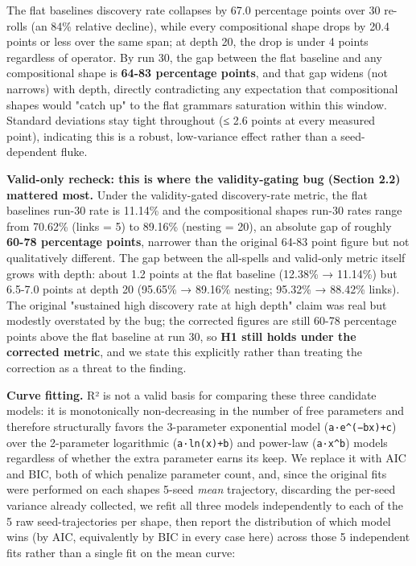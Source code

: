 \documentclass[
  10pt,
  twocolumn]{article}
\begin{document}
The flat baseline\textquotesingle s discovery rate collapses by 67.0
percentage points over 30 re-rolls (an 84\% relative decline), while
every compositional shape drops by 20.4 points or less over the same
span; at depth 20, the drop is under 4 points regardless of operator. By
run 30, the gap between the flat baseline and any compositional shape is
\textbf{64-83 percentage points}, and that gap widens (not narrows) with
depth, directly contradicting any expectation that compositional shapes
would "catch up" to the flat grammar\textquotesingle s saturation within
this window. Standard deviations stay tight throughout (≤ 2.6 points at
every measured point), indicating this is a robust, low-variance effect
rather than a seed-dependent fluke.

\textbf{Valid-only recheck: this is where the validity-gating bug
(Section 2.2) mattered most.} Under the validity-gated discovery-rate
metric, the flat baseline\textquotesingle s run-30 rate is 11.14\% and
the compositional shapes\textquotesingle{} run-30 rates range from
70.62\% (links = 5) to 89.16\% (nesting = 20), an absolute gap of
roughly \textbf{60-78 percentage points}, narrower than the original
64-83 point figure but not qualitatively different. The gap between the
all-spells and valid-only metric itself grows with depth: about 1.2
points at the flat baseline (12.38\% → 11.14\%) but 6.5-7.0 points at
depth 20 (95.65\% → 89.16\% nesting; 95.32\% → 88.42\% links). The
original "sustained high discovery rate at high depth" claim was real
but modestly overstated by the bug; the corrected figures are still
60-78 percentage points above the flat baseline at run 30, so \textbf{H1
still holds under the corrected metric}, and we state this explicitly
rather than treating the correction as a threat to the finding.

\textbf{Curve fitting.} R² is not a valid basis for comparing these
three candidate models: it is monotonically non-decreasing in the number
of free parameters and therefore structurally favors the 3-parameter
exponential model (\texttt{a·e\^{}(−bx)+c}) over the 2-parameter
logarithmic (\texttt{a·ln(x)+b}) and power-law (\texttt{a·x\^{}b})
models regardless of whether the extra parameter earns its keep. We
replace it with AIC and BIC, both of which penalize parameter count,
and, since the original fits were performed on each
shape\textquotesingle s 5-seed \emph{mean} trajectory, discarding the
per-seed variance already collected, we refit all three models
independently to each of the 5 raw seed-trajectories per shape, then
report the distribution of which model wins (by AIC, equivalently by BIC
in every case here) across those 5 independent fits rather than a single
fit on the mean curve:
\end{document}
